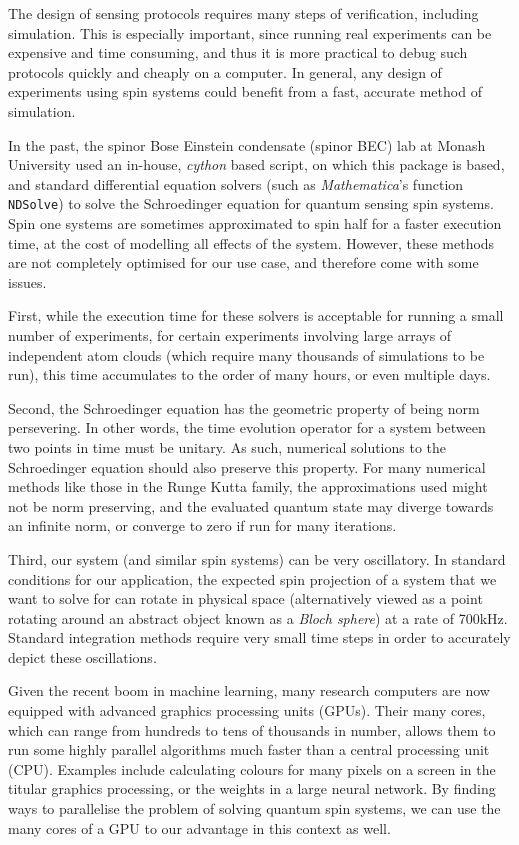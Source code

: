 \documentclass{jors}
\begin{document}
	The design of sensing protocols requires many steps of verification, including simulation.
	This is especially important, since running real experiments can be expensive and time consuming, and thus it is more practical to debug such protocols quickly and cheaply on a computer.
	In general, any design of experiments using spin systems could benefit from a fast, accurate method of simulation.

	In the past, the spinor Bose Einstein condensate (spinor BEC) lab at Monash University used an in-house, \emph{cython} based script, on which this package is based, and standard differential equation solvers (such as \emph{Mathematica}'s function \texttt{NDSolve}) to solve the Schroedinger equation for quantum sensing spin systems.
	Spin one systems are sometimes approximated to spin half for a faster execution time, at the cost of modelling all effects of the system.
	However, these methods are not completely optimised for our use case, and therefore come with some issues.

	First, while the execution time for these solvers is acceptable for running a small number of experiments, for certain experiments involving large arrays of independent atom clouds (which require many thousands of simulations to be run), this time accumulates to the order of many hours, or even multiple days.

	Second, the Schroedinger equation has the geometric property of being norm persevering.
	In other words, the time evolution operator for a system between two points in time must be unitary.
	As such, numerical solutions to the Schroedinger equation should also preserve this property.
	For many numerical methods like those in the Runge Kutta family, the approximations used might not be norm preserving, and the evaluated quantum state may diverge towards an infinite norm, or converge to zero if run for many iterations.

	Third, our system (and similar spin systems) can be very oscillatory.
	In standard conditions for our application, the expected spin projection of a system that we want to solve for can rotate in physical space (alternatively viewed as a point rotating around an abstract object known as a \emph{Bloch sphere}) at a rate of 700kHz.
	Standard integration methods require very small time steps in order to accurately depict these oscillations.

	Given the recent boom in machine learning, many research computers are now equipped with advanced graphics processing units (GPUs).
	Their many cores, which can range from hundreds to tens of thousands in number, allows them to run some highly parallel algorithms much faster than a central processing unit (CPU).
	Examples include calculating colours for many pixels on a screen in the titular graphics processing, or the weights in a large neural network.
	By finding ways to parallelise the problem of solving quantum spin systems, we can use the many cores of a GPU to our advantage in this context as well.
\end{document}
